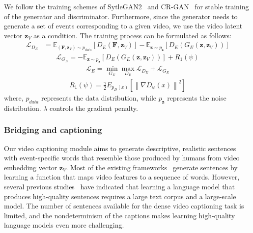 We follow the training schemes of SytleGAN2~\cite{Karras2020-fj} and CR-GAN~\cite{Tian2018-ys} for stable training of the generator and discriminator.
Furthermore, since the generator needs to generate a set of events corresponding to a given video, we use the video latent vector $\bm{z}_V$ as a condition.
The training process can be formulated as follows:
\begin{equation}
    \begin{aligned}
    \mathcal{L}_{D_E}  & = \mathbb{E}_{(\bm{F},\bm{z}_V) \sim p_{data}}[{D_E}(\bm{F},\bm{z}_V)] - \mathbb{E}_{\bm{z} \sim p_{\bm{z}}} [{D_E}({G_E}(\bm{z},\bm{z}_V))]
    \end{aligned}
\end{equation}
\begin{equation}
    \begin{aligned}
        \mathcal{L}_{G_E} = -\mathbb{E}_{\bm{z} \sim p_{\bm{z}}} [{D_E}({G_E}(\bm{z},\bm{z}_V))] + R_1(\psi)
    \end{aligned}
\end{equation}
\begin{equation}
\begin{aligned}
    \mathcal{L}_{E} = \min_{G_E} \max_{D_E} \mathcal{L}_{D_E} + \mathcal{L}_{G_E}
\end{aligned}
\end{equation}
\begin{equation}
    \begin{aligned}
        R_1(\psi)=\frac{\gamma}{2} E_{p_D(x)}\left[\left\|\nabla D_\psi(x)\right\|^2\right]
    \end{aligned}
\end{equation}
where, $p_{data}$ represents the data distribution, while $p_{\bm{z}}$ represents the noise distribution.
$\lambda$ controls the gradient penalty.

\subsubsection{Bridging and captioning}
Our video captioning module aims to generate descriptive, realistic sentences with event-specific words that resemble those produced by humans from video embedding vector $\bm{z}_V$.
Most of the existing frameworks~\cite{Krishna2017-pw,Li2018-ll,Wang2018-ap,Zhou2018-zu,Mun2019-ap,Deng2021-qd,Wang2021-zi} generate sentences by learning a function that maps video features to a sequence of words.
However, several previous studies~\cite{Raffel2020-vo,Brown2020-gx,Devlin2019-ld} have indicated that learning a language model that produces high-quality sentences requires a large text corpus and a large-scale model.
The number of sentences available for the dense video captioning task is limited, and the nondeterminism of the captions makes learning high-quality language models even more challenging.

